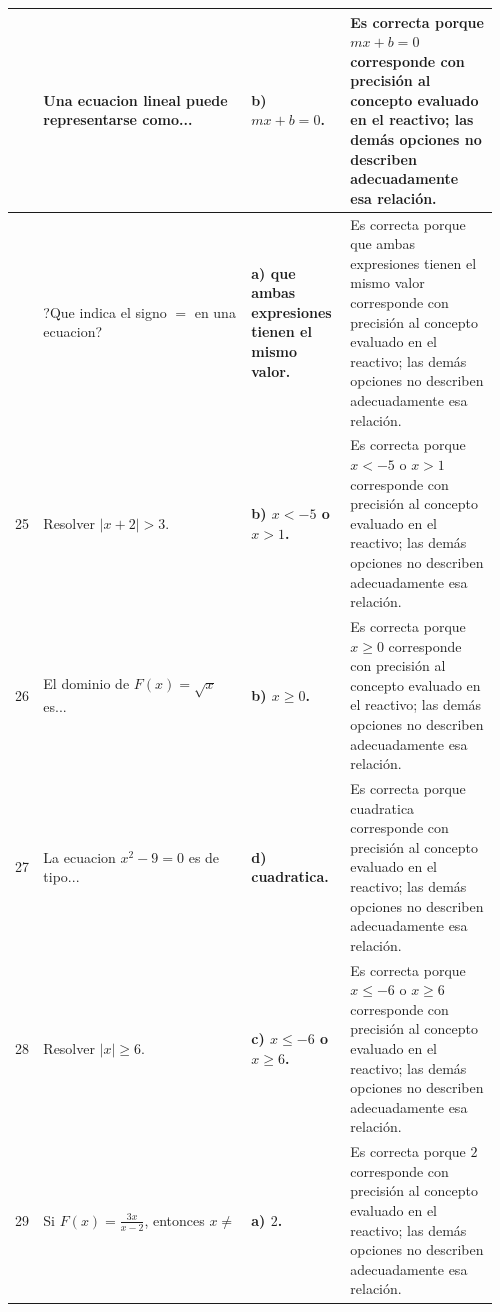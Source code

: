\documentclass[
	spanish,
	letterpaper, oneside
]{article}
\begin{document}
\begin{landscape}
\begin{longtable}{@{}>{\centering\arraybackslash}p{0.035\linewidth}>{\raggedright\arraybackslash}p{0.42\linewidth}>{\raggedright\arraybackslash}p{0.20\linewidth}>{\raggedright\arraybackslash}p{0.30\linewidth}@{}}
\midrule
23 & Una ecuacion lineal puede representarse como... & \textbf{b) $mx+b=0$.} & Es correcta porque $mx+b=0$ corresponde con precisión al concepto evaluado en el reactivo; las demás opciones no describen adecuadamente esa relación. \\
\midrule
24 & ?Que indica el signo $=$ en una ecuacion? & \textbf{a) que ambas expresiones tienen el mismo valor.} & Es correcta porque que ambas expresiones tienen el mismo valor corresponde con precisión al concepto evaluado en el reactivo; las demás opciones no describen adecuadamente esa relación. \\
\midrule
25 & Resolver $|x+2|>3$. & \textbf{b) $x<-5$ o $x>1$.} & Es correcta porque $x<-5$ o $x>1$ corresponde con precisión al concepto evaluado en el reactivo; las demás opciones no describen adecuadamente esa relación. \\
\midrule
26 & El dominio de $F(x)=\sqrt{x}$ es... & \textbf{b) $x\geq 0$.} & Es correcta porque $x\geq 0$ corresponde con precisión al concepto evaluado en el reactivo; las demás opciones no describen adecuadamente esa relación. \\
\midrule
27 & La ecuacion $x^2-9=0$ es de tipo... & \textbf{d) cuadratica.} & Es correcta porque cuadratica corresponde con precisión al concepto evaluado en el reactivo; las demás opciones no describen adecuadamente esa relación. \\
\midrule
28 & Resolver $|x|\geq 6$. & \textbf{c) $x\leq -6$ o $x\geq 6$.} & Es correcta porque $x\leq -6$ o $x\geq 6$ corresponde con precisión al concepto evaluado en el reactivo; las demás opciones no describen adecuadamente esa relación. \\
\midrule
29 & Si $F(x)=\frac{3x}{x-2}$, entonces $x\neq$ & \textbf{a) $2$.} & Es correcta porque $2$ corresponde con precisión al concepto evaluado en el reactivo; las demás opciones no describen adecuadamente esa relación. \\

\end{longtable}
\end{landscape}
\end{document}
